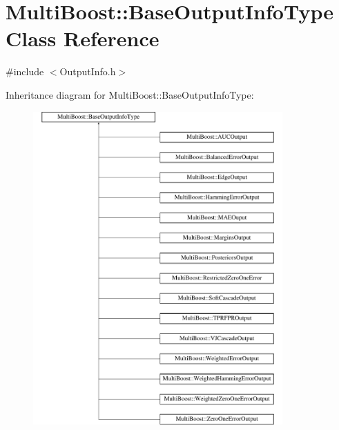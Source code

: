 \hypertarget{classMultiBoost_1_1BaseOutputInfoType}{\section{Multi\-Boost\-:\-:Base\-Output\-Info\-Type Class Reference}
\label{classMultiBoost_1_1BaseOutputInfoType}
}


{\ttfamily \#include $<$Output\-Info.\-h$>$}

Inheritance diagram for Multi\-Boost\-:\-:Base\-Output\-Info\-Type\-:\begin{figure}[H]
\begin{center}
\leavevmode
\includegraphics[height=12.000000cm]{classMultiBoost_1_1BaseOutputInfoType}
\end{center}
\end{figure}
